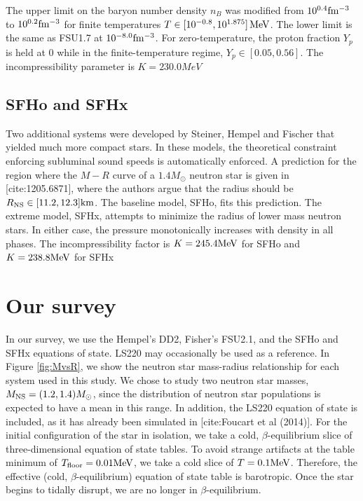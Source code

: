 The upper limit on the baryon number density $n_B$ was modified from $10^{0.4} {\rm fm^{-3}}$ to $10^{0.2} {\rm fm^{-3}}$ for finite temperatures $T \in [10^{-0.8} , 10^{1.875}]\, {\rm MeV}$.  The lower limit is the same as FSU1.7 at $10^{-8.0} {\rm fm^{-3}}$.  For zero-temperature, the proton fraction $Y_p$ is held at $0$ while in the finite-temperature regime, $Y_p \in [0.05 , 0.56]$.  The incompressibility parameter is $K = 230.0 MeV$

\subsection{SFHo and SFHx}
\label{sec:sfh}

Two additional systems were developed by Steiner, Hempel and Fischer that yielded much more compact stars.  In these models, the theoretical constraint enforcing subluminal sound speeds is automatically enforced.  A prediction for the region where the $M-R$ curve of a $1.4 M_\odot$  neutron star is given in [cite:1205.6871], where the authors argue that the radius should be $R_{\rm NS} \in [11.2,12.3] {\rm km}$.  The baseline model, SFHo, fits this prediction.  The extreme model, SFHx, attempts to minimize the radius of lower mass neutron stars.  In either case, the pressure monotonically increases with density in all phases.
The incompressibility factor is $K = 245.4 {\rm MeV}$ for SFHo and $K = 238.8 {\rm MeV}$ for SFHx

\section{Our survey}

In our survey, we use the Hempel's DD2, Fisher's FSU2.1, and the SFHo and SFHx equations of state.  
LS220 may occasionally be used as a reference. 
In Figure \ref{fig:MvsR}, we show the neutron star mass-radius relationship for each system used in this study. 
We chose to study two neutron star masses, $M_{\rm NS} = (1.2, 1.4) M_{\odot}$, since the distribution of neutron star populations is expected to have a mean in this range. 
In addition, the LS220 equation of state is included, as it has already been simulated in [cite:Foucart et al (2014)].  
For the initial configuration of the star in isolation, we take a cold, $\beta$-equilibrium slice of three-dimensional equation of state tables.  
To avoid strange artifacts at the table minimum of $T_{\rm floor} = 0.01 {\rm MeV}$, we take a cold slice of  $T = 0.1 {\rm MeV}$.  Therefore, the effective (cold, $\beta$-equilibrium) equation of state table is barotropic. Once the star begins to tidally disrupt, we are no longer in $\beta$-equilibrium.

